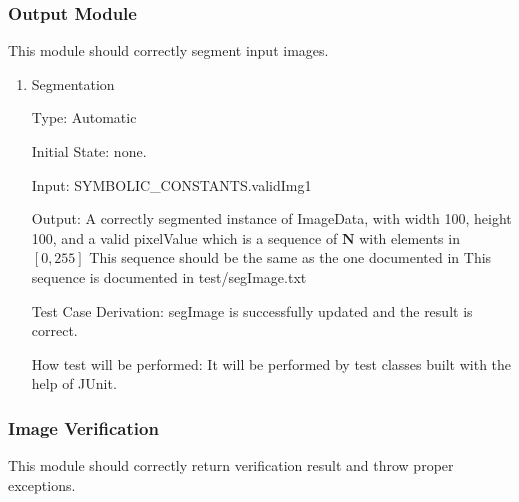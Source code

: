 \documentclass[12pt, titlepage]{article}
\begin{document}
\subsubsection{Output Module}
\label{sec_output}

This module should correctly segment input images.

\begin{enumerate}

\item{Segmentation\\}

Type: Automatic
					
Initial State: none.
					
Input: SYMBOLIC\_CONSTANTS.validImg1
					
Output: A correctly segmented instance of ImageData, with width 100, height 100,
and a valid pixelValue which is a sequence of $\mathbf{N}$ with elements in
$[0,255]$
This sequence should be the same as the one documented in This sequence is
documented in test/segImage.txt

Test Case Derivation: segImage is successfully updated and the result is
correct.

How test will be performed: It will be performed by test classes built with the
help of JUnit.

\end{enumerate}

\subsubsection{Image Verification}
\label{sec_imageVerify}

This module should correctly return verification result and throw proper
exceptions.
\end{document}
